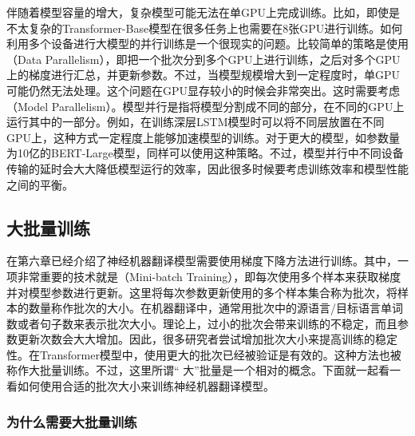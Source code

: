 \parinterval 伴随着模型容量的增大，复杂模型可能无法在单GPU上完成训练。比如，即使是不太复杂的Transformer-Base模型在很多任务上也需要在8张GPU进行训练。如何利用多个设备进行大模型的并行训练是一个很现实的问题。比较简单的策略是使用{\small{}}（Data Parallelism），即把一个批次分到多个GPU上进行训练，之后对多个GPU上的梯度进行汇总，并更新参数。不过，当模型规模增大到一定程度时，单GPU可能仍然无法处理。这个问题在GPU显存较小的时候会非常突出。这时需要考虑{\small{}}（Model Parallelism）。模型并行是指将模型分割成不同的部分，在不同的GPU上运行其中的一部分。例如，在训练深层LSTM模型时可以将不同层放置在不同GPU上，这种方式一定程度上能够加速模型的训练。对于更大的模型，如参数量为10亿的BERT-Large模型\cite{DBLP:conf/naacl/DevlinCLT19}，同样可以使用这种策略。不过，模型并行中不同设备传输的延时会大大降低模型运行的效率，因此很多时候要考虑训练效率和模型性能之间的平衡。


\subsection{大批量训练}

\parinterval 在第六章已经介绍了神经机器翻译模型需要使用梯度下降方法进行训练。其中，一项非常重要的技术就是{\small{}}（Mini-batch Training），即每次使用多个样本来获取梯度并对模型参数进行更新。这里将每次参数更新使用的多个样本集合称为批次，将样本的数量称作批次的大小。在机器翻译中，通常用批次中的源语言/目标语言单词数或者句子数来表示批次大小。理论上，过小的批次会带来训练的不稳定，而且参数更新次数会大大增加。因此，很多研究者尝试增加批次大小来提高训练的稳定性。在Transformer模型中，使用更大的批次已经被验证是有效的。这种方法也被称作大批量训练。不过，这里所谓`` 大''批量是一个相对的概念。下面就一起看一看如何使用合适的批次大小来训练神经机器翻译模型。


\subsubsection{为什么需要大批量训练}

